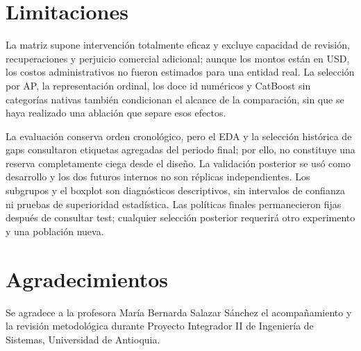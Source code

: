 \documentclass[conference,letterpaper]{IEEEtran}
\begin{document}
\section{Limitaciones}
La matriz supone intervención totalmente eficaz y excluye capacidad de revisión, recuperaciones y perjuicio comercial adicional; aunque los montos están en USD, los costos administrativos no fueron estimados para una entidad real. La selección por AP, la representación ordinal, los doce id numéricos y CatBoost sin categorías nativas también condicionan el alcance de la comparación, sin que se haya realizado una ablación que separe esos efectos.

La evaluación conserva orden cronológico, pero el EDA y la selección histórica de gaps consultaron etiquetas agregadas del periodo final; por ello, no constituye una reserva completamente ciega desde el diseño. La validación posterior se usó como desarrollo y los dos futuros internos no son réplicas independientes. Los subgrupos y el boxplot son diagnósticos descriptivos, sin intervalos de confianza ni pruebas de superioridad estadística. Las políticas finales permanecieron fijas después de consultar test; cualquier selección posterior requerirá otro experimento y una población nueva.

\noindent\begin{minipage}{\columnwidth}
\section*{Agradecimientos}
Se agradece a la profesora María Bernarda Salazar Sánchez el acompañamiento y la revisión metodológica durante Proyecto Integrador II de Ingeniería de Sistemas, Universidad de Antioquia.
\end{minipage}
\end{document}
